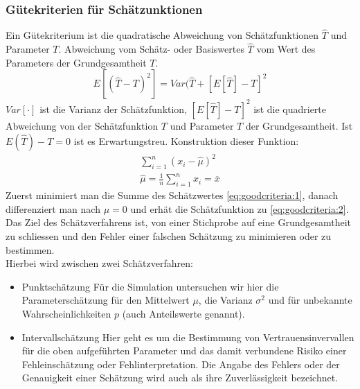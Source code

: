 \subsubsection{Gütekriterien für Schätzunktionen}
Ein Gütekriterium ist die quadratische Abweichung von Schätzfunktionen $\widehat{T}$ und Parameter $T$. Abweichung vom Schätz- oder Basiswertes $\widehat{T}$ vom Wert des Parameters der Grundgesamtheit $T$.
\begin{equation}
E[(\widehat{T}-T)^2] = Var(\widehat{T} + [E[\widehat{T}]-T]^2
\end{equation}
$Var[\cdot]$ ist die Varianz der Schätzfunktion, $[E[\widehat{T}]-T]^2$ ist die quadrierte Abweichung von der Schätzfunktion $T$ und Parameter $T$ der Grundgesamtheit. Ist $E(\widehat{T})-T=0$ ist es Erwartungstreu.
Konstruktion dieser Funktion:
\begin{align}
\sum_{i=1}^n(x_i-\widehat{\mu})^2 \label{eq:goodcriteria:1} \\
\widehat{\mu}=\frac{1}{n}\sum_{i=1}^n x_i = \overline{x} \label{eq:goodcriteria:2}
\end{align}
Zuerst minimiert man die Summe des Schätzwertes \autoref{eq:goodcriteria:1}, danach differenziert man nach $\mu = 0$ und erhät die Schätzfunktion zu \autoref{eq:goodcriteria:2}. \\
Das Ziel des Schätzverfahrens ist, von einer Stichprobe auf eine Grundgesamtheit zu schliessen und den Fehler einer falschen Schätzung zu minimieren oder zu bestimmen.\\
Hierbei wird zwischen zwei Schätzverfahren:
\begin{itemize}
\item Punktschätzung
\subitem Für die Simulation untersuchen wir hier die Parameterschätzung für den Mittelwert $\mu$, die Varianz $\sigma^2$ und für unbekannte Wahrscheinlichkeiten $p$ (auch Anteilswerte genannt).
\item Intervallschätzung
\subitem Hier geht es um die Bestimmung von Vertrauensinvervallen für die oben aufgeführten Parameter und das damit verbundene Risiko einer Fehleinschätzung oder Fehlinterpretation. Die Angabe des Fehlers oder der Genauigkeit einer Schätzung wird auch als ihre Zuverlässigkeit bezeichnet.
\end{itemize}
